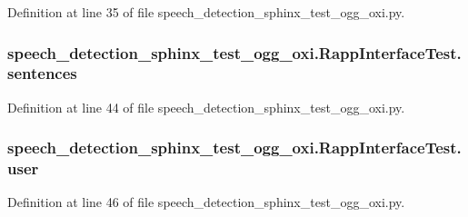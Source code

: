 Definition at line 35 of file speech\-\_\-detection\-\_\-sphinx\-\_\-test\-\_\-ogg\-\_\-oxi.\-py.

\hypertarget{classspeech__detection__sphinx__test__ogg__oxi_1_1RappInterfaceTest_a83c05a45ccb94ba78b3b208a4badf1f4}{
\subsubsection[{sentences}]{\setlength{\rightskip}{0pt plus 5cm}speech\-\_\-detection\-\_\-sphinx\-\_\-test\-\_\-ogg\-\_\-oxi.\-Rapp\-Interface\-Test.\-sentences}}\label{classspeech__detection__sphinx__test__ogg__oxi_1_1RappInterfaceTest_a83c05a45ccb94ba78b3b208a4badf1f4}


Definition at line 44 of file speech\-\_\-detection\-\_\-sphinx\-\_\-test\-\_\-ogg\-\_\-oxi.\-py.

\hypertarget{classspeech__detection__sphinx__test__ogg__oxi_1_1RappInterfaceTest_ae17370c18d7006f3c55834a90d176c19}{
\subsubsection[{user}]{\setlength{\rightskip}{0pt plus 5cm}speech\-\_\-detection\-\_\-sphinx\-\_\-test\-\_\-ogg\-\_\-oxi.\-Rapp\-Interface\-Test.\-user}}\label{classspeech__detection__sphinx__test__ogg__oxi_1_1RappInterfaceTest_ae17370c18d7006f3c55834a90d176c19}


Definition at line 46 of file speech\-\_\-detection\-\_\-sphinx\-\_\-test\-\_\-ogg\-\_\-oxi.\-py.


